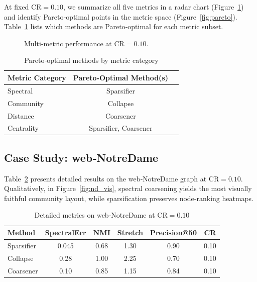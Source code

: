 At fixed \(\mathrm{CR}=0.10\), we summarize all five metrics in a radar chart (Figure~\ref{fig:radar}) and identify Pareto‐optimal points in the metric space (Figure~\ref{fig:pareto}).  Table~\ref{tab:pareto} lists which methods are Pareto‐optimal for each metric subset.

\begin{figure}[h]
  \centering
  \caption{Multi‐metric performance at \(\mathrm{CR}=0.10\).}
  \label{fig:radar}
\end{figure}

\begin{table}[h]
  \centering
  \caption{Pareto‐optimal methods by metric category}
  \label{tab:pareto}
  \begin{tabular}{lcc}
    \toprule
    Metric Category      & Pareto‐Optimal Method(s) \\
    \midrule
    Spectral & Sparsifier \\
    Community & Collapse \\
    Distance & Coarsener \\
    Centrality & Sparsifier, Coarsener \\
    \bottomrule
  \end{tabular}
\end{table}

\subsection{Case Study: web‐NotreDame}

Table~\ref{tab:nd_detail} presents detailed results on the web‐NotreDame graph at \(\mathrm{CR}=0.10\).  Qualitatively, in Figure~\ref{fig:nd_vis}, spectral coarsening yields the most visually faithful community layout, while sparsification preserves node‐ranking heatmaps.

\begin{table}[h]
  \centering
  \caption{Detailed metrics on web‐NotreDame at \(\mathrm{CR}=0.10\)}
  \label{tab:nd_detail}
  \begin{tabular}{lccccc}
    \toprule
    Method     & SpectralErr & NMI   & Stretch & Precision@50 & CR \\
    \midrule
    Sparsifier & 0.045       & 0.68  & 1.30    & 0.90         & 0.10 \\
    Collapse   & 0.28        & 1.00  & 2.25    & 0.70         & 0.10 \\
    Coarsener  & 0.10        & 0.85  & 1.15    & 0.84         & 0.10 \\
    \bottomrule
  \end{tabular}
\end{table}

